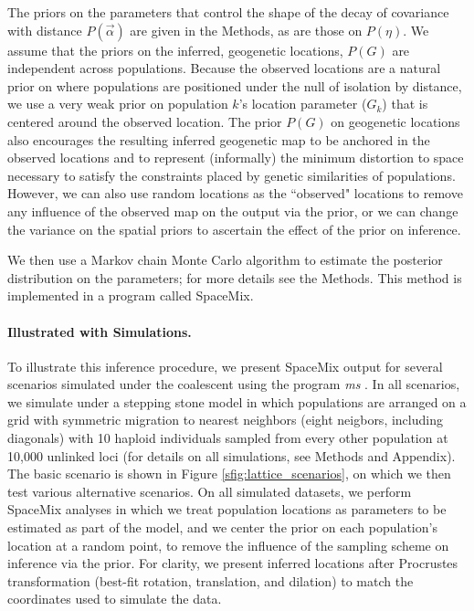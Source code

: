 \documentclass[12pt]{article}
\newcommand{\gc}[1]{{\it\color{blue}{(#1)}}}
\begin{document}
The priors on the parameters that control the shape of the decay of covariance with distance $P(\vec{\alpha})$ are given in the Methods, as are those on $P(\eta)$.  We assume that the priors on the inferred, geogenetic locations, $P(G)$ are independent across populations.  Because the observed locations are a natural prior on where populations are positioned under the null of isolation by distance, we use a very weak prior on population $k$'s location parameter ($G_k$) that is centered around the observed location.
The prior $P(G)$ on geogenetic locations
also encourages the resulting inferred geogenetic map to be anchored in the observed locations and to represent (informally) the minimum distortion to space necessary to satisfy the constraints placed by genetic similarities of populations.  However, we can also use random locations as the ``observed" locations to remove any influence of the observed map on the output via the prior, or we can change the variance on the spatial priors to ascertain the effect of the prior on inference. 

We then use a Markov chain Monte Carlo algorithm to estimate the posterior distribution on the parameters; for more details see the Methods. 
This method is implemented in a program called SpaceMix.

\paragraph{Illustrated with Simulations.} To illustrate this inference procedure, we present SpaceMix output for several scenarios simulated under the coalescent using the program \textit{ms} \citep{Hudson2002}.  In all scenarios, we simulate under a stepping stone model in which populations are arranged on a grid with symmetric migration 
to nearest neighbors (eight neigbors, including diagonals)
with 10 haploid individuals sampled from every other population at 10,000 unlinked loci (for details on all simulations, see Methods and Appendix).  
The basic scenario is shown in Figure  \ref{sfig:lattice_scenarios}, 
on which we then test various alternative scenarios.
On all simulated datasets, we perform SpaceMix analyses in which we treat population locations as parameters to be estimated as part of the model, 
and we center the prior on each population's location at a random point, to remove the influence of the sampling scheme on inference via the prior.  
\gc{To produce geogenetic maps we take the maximum a posteriori estimates (over all parameters).} 
For clarity, we present inferred locations after Procrustes transformation
(best-fit rotation, translation, and dilation) 
to match the coordinates used to simulate the data.
\end{document}

